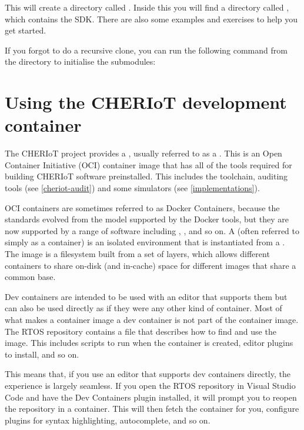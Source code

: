 This will create a directory called .
Inside this you will find a directory called , which contains the SDK.
There are also some examples and exercises to help you get started.

If you forgot to do a recursive clone, you can run the following command from the  directory to initialise the submodules:


\section[label=devcontainer]{Using the CHERIoT development container}

The CHERIoT project provides a , usually referred to as a .
This is an Open Container Initiative (OCI) container image that has all of the tools required for building CHERIoT software preinstalled.
This includes the toolchain, auditing tools (see \ref{cheriot-audit}) and some simulators (see \ref{implementations}).

OCI containers are sometimes referred to as Docker Containers, because the standards evolved from the model supported by the Docker tools, but they are now supported by a range of software including , , and so on.
A  (often referred to simply as a container) is an isolated environment that is instantiated from a .
The image is a filesystem built from a set of layers, which allows different containers to share on-disk (and in-cache) space for different images that share a common base.

Dev containers are intended to be used with an editor that supports them but can also be used directly as if they were any other kind of container.
Most of what makes a container image a dev container is not part of the container image.
The RTOS repository contains a  file that describes how to find and use the image.
This includes scripts to run when the container is created, editor plugins to install, and so on.

This means that, if you use an editor that supports dev containers directly, the experience is largely seamless.
If you open the RTOS repository in Visual Studio Code and have the Dev Containers plugin installed, it will prompt you to reopen the repository in a container.
This will then fetch the container for you, configure plugins for syntax highlighting, autocomplete, and so on.

